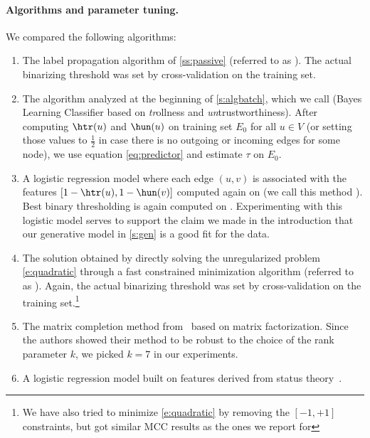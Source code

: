 \paragraph{Algorithms and parameter tuning.} 
We compared the following algorithms:

\begin{enumerate}[label=\textbf{\arabic*.}]
  \item The label propagation algorithm of \autoref{ss:passive} (referred to as \uslpropGsec{}).
    The actual binarizing threshold was set by cross-validation on the training set.

  \item The algorithm analyzed at the beginning of \autoref{s:algbatch}, which we call \usrule{}
    (Bayes Learning Classifier based on \emph{tr}ollness and \emph{un}trustworthiness). After
    computing $\htr(u)$ and $\hun(u)$ on training set $E_0$ for all $u \in V$ (or setting those
    values to $\frac{1}{2}$ in case there is no outgoing or incoming edges for some node), we use
    equation \eqref{eq:predictor} and estimate $\tau$ on $E_0$.

  \item A logistic regression model where each edge $(u,v)$ is associated with the features
    $[1-\htr(u), 1-\hun(v)]$ computed again on \trainset{} (we call this method \uslogregp{}). Best
    binary thresholding is again computed on \trainset{}. Experimenting with this logistic model
    serves to support the claim we made in the introduction that our generative model in
    \autoref{s:gen} is a good fit for the data.

  \item  The solution obtained by directly solving the unregularized problem \eqref{e:quadratic}
    through a fast constrained minimization algorithm (referred to as \qoptim{}). Again, the actual
    binarizing threshold was set by cross-validation on the training set.\footnote{We have also
    tried to minimize \eqref{e:quadratic} by removing the $[-1,+1]$ constraints, but got similar MCC
    results as the ones we report for \qoptim{}}

  \item  The matrix completion method from~\autocite{LowRankCompletion14} based on \complowrank{}
    matrix factorization. Since the authors showed their method to be robust to the choice of the
    rank parameter $k$, we picked $k=7$ in our experiments.

  \item A logistic regression model built on \comptriads{} features derived from status
    theory~\autocite{Leskovec2010}.


\end{enumerate}
